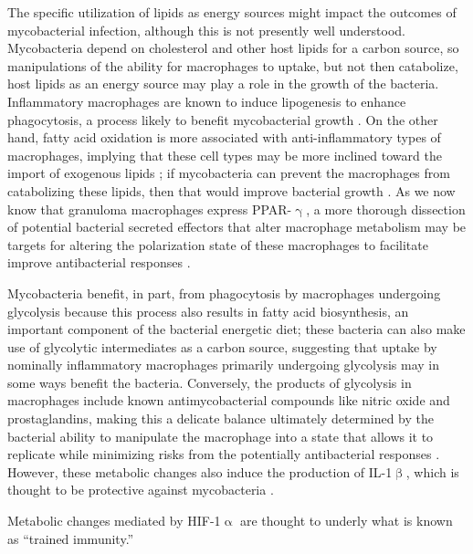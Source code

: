 The specific utilization of lipids as energy sources might impact the outcomes of mycobacterial infection, although this is not presently well understood. Mycobacteria depend on cholesterol and other host lipids for a carbon source, so manipulations of the ability for macrophages to uptake, but not then catabolize, host lipids as an energy source may play a role in the growth of the bacteria. Inflammatory macrophages are known to induce lipogenesis to enhance phagocytosis, a process likely to benefit mycobacterial growth \citep{Yan2020}. On the other hand, fatty acid oxidation is more associated with anti-inflammatory types of macrophages, implying that these cell types may be more inclined toward the import of exogenous lipids \citep{Yan2020}; if mycobacteria can prevent the macrophages from catabolizing these lipids, then that would improve bacterial growth \citep{Nazarova2019}. As we now know that granuloma macrophages express PPAR-$\upgamma$, a more thorough dissection of potential bacterial secreted effectors that alter macrophage metabolism may be targets for altering the polarization state of these macrophages to facilitate improve antibacterial responses \citep{Phan2017, Gideon2022, Cronan2021, Chawla2001}. 

Mycobacteria benefit, in part, from phagocytosis by macrophages undergoing glycolysis because this process also results in fatty acid biosynthesis, an important component of the bacterial energetic diet; these bacteria can also make use of glycolytic intermediates as a carbon source, suggesting that uptake by nominally inflammatory macrophages primarily undergoing glycolysis may in some ways benefit the bacteria. Conversely, the products of glycolysis in macrophages include known antimycobacterial compounds like nitric oxide and prostaglandins, making this a delicate balance ultimately determined by the bacterial ability to manipulate the macrophage into a state that allows it to replicate while minimizing risks from the potentially antibacterial responses \citep{OsadaOka2019}. However, these metabolic changes also induce the production of IL-1$\upbeta$, which is thought to be protective against mycobacteria \citep{Corcoran2016, Ogryzko2019, Fremond2007}.

Metabolic changes mediated by HIF-1$\upalpha$ are thought to underly what is known as ``trained immunity.'' 

